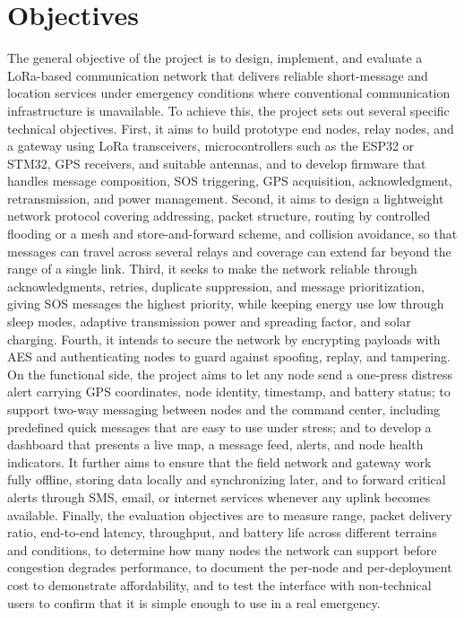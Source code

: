 \section{Objectives}
The general objective of the project is to design, implement, and evaluate a LoRa-based communication network that delivers reliable short-message and location services under emergency conditions where conventional communication infrastructure is unavailable. To achieve this, the project sets out several specific technical objectives. First, it aims to build prototype end nodes, relay nodes, and a gateway using LoRa transceivers, microcontrollers such as the ESP32 or STM32, GPS receivers, and suitable antennas, and to develop firmware that handles message composition, SOS triggering, GPS acquisition, acknowledgment, retransmission, and power management. Second, it aims to design a lightweight network protocol covering addressing, packet structure, routing by controlled flooding or a mesh and store-and-forward scheme, and collision avoidance, so that messages can travel across several relays and coverage can extend far beyond the range of a single link. Third, it seeks to make the network reliable through acknowledgments, retries, duplicate suppression, and message prioritization, giving SOS messages the highest priority, while keeping energy use low through sleep modes, adaptive transmission power and spreading factor, and solar charging. Fourth, it intends to secure the network by encrypting payloads with AES and authenticating nodes to guard against spoofing, replay, and tampering. On the functional side, the project aims to let any node send a one-press distress alert carrying GPS coordinates, node identity, timestamp, and battery status; to support two-way messaging between nodes and the command center, including predefined quick messages that are easy to use under stress; and to develop a dashboard that presents a live map, a message feed, alerts, and node health indicators. It further aims to ensure that the field network and gateway work fully offline, storing data locally and synchronizing later, and to forward critical alerts through SMS, email, or internet services whenever any uplink becomes available. Finally, the evaluation objectives are to measure range, packet delivery ratio, end-to-end latency, throughput, and battery life across different terrains and conditions, to determine how many nodes the network can support before congestion degrades performance, to document the per-node and per-deployment cost to demonstrate affordability, and to test the interface with non-technical users to confirm that it is simple enough to use in a real emergency.

